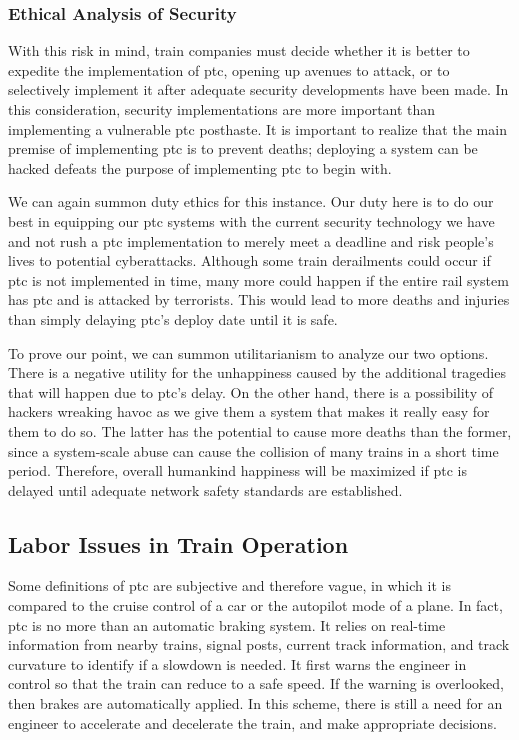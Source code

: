 \documentclass[11pt, titlepage]{article}
\begin{document}
\subsubsection{Ethical Analysis of Security}

With this risk in mind, train companies must decide whether it is better to expedite
the implementation of \gls{ptc}, opening up avenues to attack, or to selectively
implement it after adequate security developments have been made. In this
consideration, security implementations are more important than implementing a
vulnerable \gls{ptc} posthaste. It is important to realize that the main premise of
implementing \gls{ptc} is to prevent deaths; deploying a system can be hacked
defeats the purpose of implementing \gls{ptc} to begin with.

We can again summon duty ethics for this instance. Our duty here is to do our best
in equipping our \gls{ptc} systems with the current security technology we have and
not rush a \gls{ptc} implementation to merely meet a deadline and risk people’s
lives to potential cyberattacks. Although some train derailments could occur if
\gls{ptc} is not implemented in time, many more could happen if the entire rail
system has \gls{ptc} and is attacked by terrorists. This would lead to more deaths
and injuries than simply delaying \gls{ptc}’s deploy date until it is safe.

To prove our point, we can summon utilitarianism to analyze our two options. There
is a negative utility for the unhappiness caused by the additional tragedies that
will happen due to \gls{ptc}’s delay. On the other hand, there is a possibility of
hackers wreaking havoc as we give them a system that makes it really easy for them
to do so. The latter has the potential to cause more deaths than the former, since a
system-scale abuse can cause the collision of many trains in a short time period.
Therefore, overall humankind happiness will be maximized if \gls{ptc} is delayed
until adequate network safety standards are established.

\subsection{Labor Issues in Train Operation}

Some definitions of \gls{ptc} are subjective and therefore vague, in which it is
compared to the cruise control of a car or the autopilot mode of a plane. In fact,
\gls{ptc} is no more than an automatic braking system. It relies on real-time
information from nearby trains, signal posts, current track information, and track
curvature to identify if a slowdown is needed. It first warns the engineer in
control so that the train can reduce to a safe speed. If the warning is overlooked,
then brakes are automatically applied. In this scheme, there is still a need for an
engineer to accelerate and decelerate the train, and make appropriate decisions.
\end{document}

